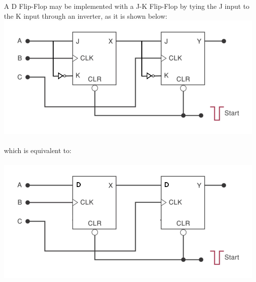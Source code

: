 \documentclass[a4paper]{article}
\begin{document}
A D Flip-Flop may be implemented with a J-K Flip-Flop by tying the J input to the K input through an inverter, as it is shown below:\\
\includegraphics[scale=0.3]{circuit2.png}
\\
\\
which is equivalent to:\\
\\
\includegraphics[scale=0.3]{circuit3.png}
\end{document}
